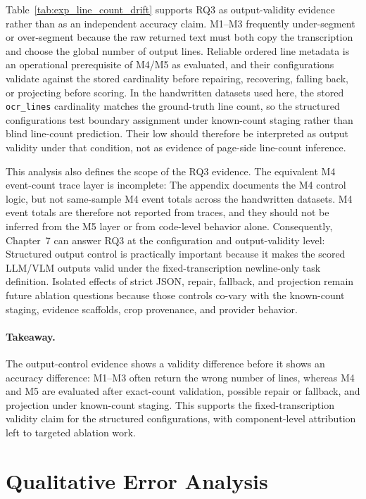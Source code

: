 Table~\ref{tab:exp_line_count_drift} supports RQ3 as output-validity evidence rather than as an independent accuracy claim. M1--M3 frequently under-segment or over-segment because the raw returned text must both copy the transcription and choose the global number of output lines. Reliable ordered line metadata is an operational prerequisite of M4/M5 as evaluated, and their configurations validate against the stored cardinality before repairing, recovering, falling back, or projecting before scoring. In the handwritten datasets used here, the stored \texttt{ocr\_lines} cardinality matches the ground-truth line count, so the structured configurations test boundary assignment under known-count staging rather than blind line-count prediction. Their low \MeanAbsLineDelta{} should therefore be interpreted as output validity under that condition, not as evidence of page-side line-count inference.

This analysis also defines the scope of the RQ3 evidence. The equivalent M4 event-count trace layer is incomplete: The appendix documents the M4 control logic, but not same-sample M4 event totals across the handwritten datasets. M4 event totals are therefore not reported from traces, and they should not be inferred from the M5 layer or from code-level behavior alone. Consequently, Chapter~7 can answer RQ3 at the configuration and output-validity level: Structured output control is practically important because it makes the scored LLM/VLM outputs valid under the fixed-transcription newline-only task definition. Isolated effects of strict JSON, repair, fallback, and projection remain future ablation questions because those controls co-vary with the known-count staging, evidence scaffolds, crop provenance, and provider behavior.

\paragraph{Takeaway.}
The output-control evidence shows a validity difference before it shows an accuracy difference: M1--M3 often return the wrong number of lines, whereas M4 and M5 are evaluated after exact-count validation, possible repair or fallback, and projection under known-count staging. This supports the fixed-transcription validity claim for the structured configurations, with component-level attribution left to targeted ablation work.

\section{Qualitative Error Analysis}
\label{sec:experimentation_qualitative}

